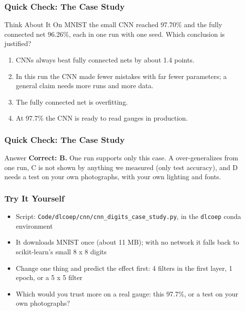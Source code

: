 \begin{frame}[fragile]\frametitle{Quick Check: The Case Study}
\begin{block}{Think About It}
On MNIST the small CNN reached 97.70\% and the fully connected net 96.26\%, each in one run with one seed. Which conclusion is justified?
\begin{enumerate}
  \item[A.] CNNs always beat fully connected nets by about 1.4 points.
  \item[B.] In this run the CNN made fewer mistakes with far fewer parameters; a general claim needs more runs and more data.
  \item[C.] The fully connected net is overfitting.
  \item[D.] At 97.7\% the CNN is ready to read gauges in production.
\end{enumerate}
\end{block}
\end{frame}

\begin{frame}[fragile]\frametitle{Quick Check: The Case Study}
\begin{block}{Answer}
\textbf{Correct: B.} One run supports only this case. A over-generalizes from one run, C is not shown by anything we measured (only test accuracy), and D needs a test on your own photographs, with your own lighting and fonts.
\end{block}
\end{frame}

\begin{frame}[fragile]\frametitle{Try It Yourself}
\begin{itemize}
\item Script: \texttt{Code/\allowbreak dlcoep/\allowbreak cnn/\allowbreak cnn\_digits\_case\_study.py}, in the \texttt{dlcoep} conda environment
\item It downloads MNIST once (about 11 MB); with no network it falls back to scikit-learn's small 8 x 8 digits
\item Change one thing and predict the effect first: 4 filters in the first layer, 1 epoch, or a 5 x 5 filter
\item Which would you trust more on a real gauge: this 97.7\%, or a test on your own photographs?
\end{itemize}
\end{frame}
